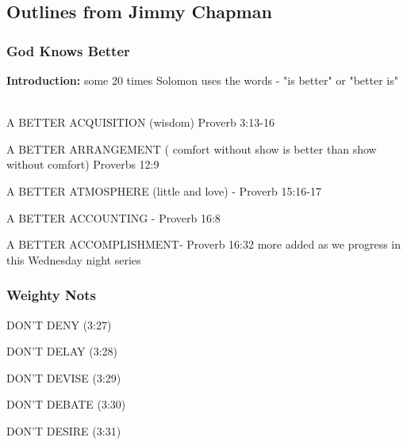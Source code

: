 \subsection{Outlines from Jimmy Chapman}


\subsubsection{God Knows Better}


\noindent  \textbf{Introduction: } some 20 times Solomon uses the words - "is better" or "better is"  \\
\\

\begin{compactenum}[I.]
    \item A BETTER ACQUISITION (wisdom) Proverb 3:13-16
    \item  A BETTER ARRANGEMENT ( comfort without show  is better than show without comfort) Proverbs 12:9 
    \item  A BETTER ATMOSPHERE (little and love)  - Proverb 15:16‐17
    \item A BETTER ACCOUNTING -  Proverb 16:8
    \item A BETTER ACCOMPLISHMENT- Proverb 16:32
more added as we progress in this Wednesday night series
\end{compactenum}





\subsubsection{Weighty Nots}



\begin{compactenum}[I.]
    \item DON’T DENY  (3:27)
    \item DON’T DELAY  (3:28)
    \item DON’T DEVISE (3:29)
    \item DON’T DEBATE (3:30)
    \item DON'T DESIRE (3:31)
\end{compactenum}





